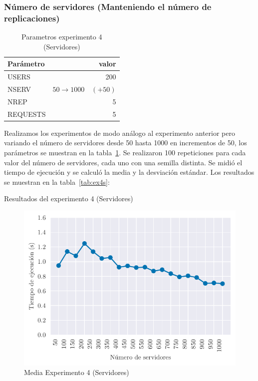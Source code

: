 \subsubsection{Número de servidores (Manteniendo el número de replicaciones)}

\begin{table}[H]
    \caption{Parametros experimento 4 (Servidores)}%
    \label{tab:ex4s_par}
    \begin{center}
    \begin{tabular}{lr}
    \toprule
    Parámetro & valor \\
    \midrule
    USERS & 200 \\
    NSERV & $50 \to 1000 \quad (+50)$ \\
    NREP & 5 \\
    REQUESTS & 5\\
    \bottomrule
    \end{tabular}
    \end{center}
\end{table}

Realizamos los experimentos de modo análogo al experimento anterior pero variando el número
de servidores desde 50 hasta 1000 en incrementos de 50, los parámetros se muestran en la
tabla~\ref{tab:ex4s_par}. Se realizaron 100 repeticiones para
cada valor del número de servidores, cada uno con una semilla distinta.
Se midió el tiempo de ejecución y se calculó la media
y la desviación estándar. Los resultados se muestran en la tabla~\ref{tab:ex4s}:

\begin{table}[H]
    \caption{Resultados del experimento 4 (Servidores)}%
    \label{tab:ex4s}
    \begin{center}
    
    \end{center}
\end{table}

\begin{figure}[H]
    \centering
    \includegraphics{include/plots/ex4_s_mean_time.pdf}
    \caption{Media Experimento 4 (Servidores)}%
    \label{fig:ex4s_mean}
\end{figure}

